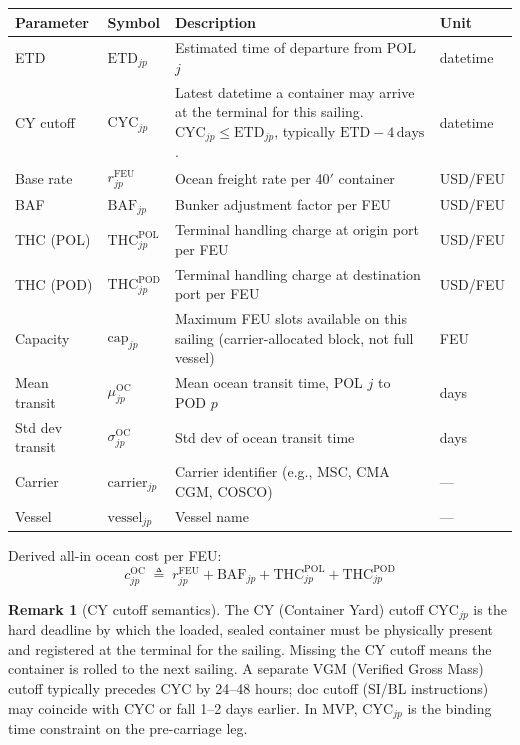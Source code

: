 \documentclass[11pt,a4paper]{article}
\newcommand{\defeq}{\triangleq}
\theoremstyle{definition}
\newtheorem{remark}{Remark}
\begin{document}
\begin{center}
\begin{tabular}{llp{6cm}l}
\toprule
Parameter & Symbol & Description & Unit \\
\midrule
ETD & $\text{ETD}_{jp}$ & Estimated time of departure from POL $j$ & datetime \\
CY cutoff & $\text{CYC}_{jp}$ & Latest datetime a container may arrive at the terminal for this sailing. $\text{CYC}_{jp} \leq \text{ETD}_{jp}$, typically $\text{ETD} - 4\,\text{days}$. & datetime \\
Base rate & $r_{jp}^{\text{FEU}}$ & Ocean freight rate per 40$'$ container & USD/FEU \\
BAF & $\text{BAF}_{jp}$ & Bunker adjustment factor per FEU & USD/FEU \\
THC (POL) & $\text{THC}_{jp}^{\text{POL}}$ & Terminal handling charge at origin port per FEU & USD/FEU \\
THC (POD) & $\text{THC}_{jp}^{\text{POD}}$ & Terminal handling charge at destination port per FEU & USD/FEU \\
Capacity & $\text{cap}_{jp}$ & Maximum FEU slots available on this sailing (carrier-allocated block, not full vessel) & FEU \\
Mean transit & $\mu_{jp}^{\text{OC}}$ & Mean ocean transit time, POL $j$ to POD $p$ & days \\
Std dev transit & $\sigma_{jp}^{\text{OC}}$ & Std dev of ocean transit time & days \\
Carrier & $\text{carrier}_{jp}$ & Carrier identifier (e.g., MSC, CMA CGM, COSCO) & --- \\
Vessel & $\text{vessel}_{jp}$ & Vessel name & --- \\
\bottomrule
\end{tabular}
\end{center}

\noindent Derived all-in ocean cost per FEU:
\[
  c_{jp}^{\text{OC}} \;\defeq\; r_{jp}^{\text{FEU}} + \text{BAF}_{jp} + \text{THC}_{jp}^{\text{POL}} + \text{THC}_{jp}^{\text{POD}}
\]

\begin{remark}[CY cutoff semantics]
The CY (Container Yard) cutoff $\text{CYC}_{jp}$ is the hard deadline by which the
loaded, sealed container must be physically present and registered at the terminal for
the sailing. Missing the CY cutoff means the container is rolled to the next sailing.
A separate VGM (Verified Gross Mass) cutoff typically precedes CYC by 24--48 hours;
doc cutoff (SI/BL instructions) may coincide with CYC or fall 1--2 days earlier.
In MVP, $\text{CYC}_{jp}$ is the binding time constraint on the pre-carriage leg.
\end{remark}
\end{document}
